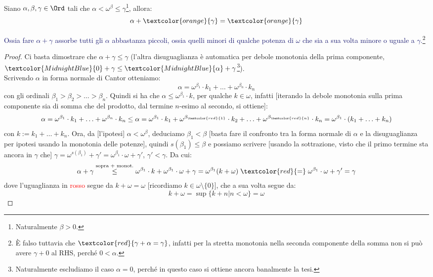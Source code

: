 \documentclass[11pt]{scrartcl}
\begin{document}
\begin{lemma}
	Siano $\alpha,\beta,\gamma \in \Ord$ tali che $\alpha < \omega^{\beta} \leq \gamma$\footnote{Naturalmente $\beta>0$.}, allora:
	\[ \alpha + \textcolor{orange}{\gamma} = \textcolor{orange}{\gamma}
		\]
\end{lemma}

\textcolor{MidnightBlue}{Ossia fare $\alpha + \gamma$ assorbe tutti gli $\alpha$ abbastanza piccoli, ossia quelli minori di qualche potenza di $\omega$ che sia a sua volta minore o uguale a $\gamma$.}\footnote{È falso 
tuttavia che $\textcolor{red}{\gamma + \alpha = \gamma}$, infatti per la stretta monotonia nella seconda componente della somma non si può avere $\gamma + 0$ al RHS, perché $0 < \alpha$.}

\begin{proof}
	Ci basta dimostrare che $\alpha + \gamma \leq \gamma$ (l'altra disuguaglianza è automatica per debole monotonia della prima componente, $\textcolor{MidnightBlue}{0} + \gamma \leq \textcolor{MidnightBlue}{\alpha} + \gamma$\footnote{Naturalmente escludiamo il caso $\alpha = 0$, perché in questo caso si ottiene ancora banalmente la tesi.}).\\
	Scrivendo $\alpha$ in forma normale di Cantor otteniamo:
	\[ \alpha = \omega^{\beta_1} \cdot k_1 + \ldots + \omega^{\beta_n} \cdot k_n
		\]
	con gli ordinali $\beta_1 > \beta_2 > \ldots > \beta_n$. Quindi si ha che $\alpha \leq \omega^{\beta_1} \cdot k$, per qualche $k \in \omega$, infatti [iterando la debole monotonia sulla prima componente sia di somma che del prodotto, dal termine $n$-esimo al secondo, si ottiene]:
	\[ \alpha = \omega^{\beta_1} \cdot k_1 + \ldots + \omega^{\beta_n} \cdot k_n \leq \alpha = \omega^{\beta_1} \cdot k_1 + \omega^{\beta_{\textcolor{red}{1}}} \cdot k_2 + \ldots + \omega^{\beta_{\textcolor{red}{n}}} \cdot k_n = \omega^{\beta_1}\cdot (k_1 + \ldots + k_n)
		\]
	con $k := k_1 + \ldots + k_n$. Ora, da [l'ipotesi] $\alpha < \omega^\beta$, deduciamo $\beta_1 < \beta$ [basta fare il confronto tra la forma normale di $\alpha$ e la disuguaglianza per ipotesi usando la monotonia delle potenze],
	quindi $s(\beta_1) \leq \beta$ e possiamo scrivere [usando la sottrazione, visto che il primo termine sta ancora in $\gamma$ che] $\gamma = \omega^{s(\beta_1)} + \gamma' = \omega^{\beta_1} \cdot \omega + \gamma'$, $\gamma' < \gamma$.
	Da cui:
	\[ \alpha + \gamma \overset{\text{sopra + monot.}}{\leq} \omega^{\beta_1} \cdot k + \omega^{\beta_1} \cdot \omega + \gamma = \omega^{\beta_1} (k + \omega) \;\textcolor{red}{=}\; \omega^{\beta_1} \cdot \omega + \gamma' = \gamma
		\]
	dove l'uguaglianza in \textcolor{red}{rosso} segue da $k + \omega = \omega$ [ricordiamo $k \in \omega\setminus\{0\}$], che a sua volta segue da:
	\[ k + \omega = \sup\{k + n | n < \omega\} = \omega
		\]
\end{proof}
\end{document}
